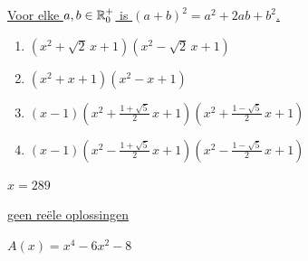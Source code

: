 \documentclass{ximera}
\begin{document}
\begin{oplossing} 
\hyperlink{oef4.10}{Voor elke $a,b \in \mathbb{R}^+_0$ is $(a+b)^2 = a^2 + 2ab + b^2$.}
\end{oplossing} 

\begin{oplossing} 
\begin{enumerate}
\item
\hyperlink{oef4.11}{$(x^2+\sqrt{2}\,x+1)(x^2-\sqrt{2}\,x+1)$}
\item
\hyperlink{oef4.11}{$(x^2+x+1)(x^2-x+1)$}
\item
\hyperlink{oef4.11}{$(x-1)\left(x^2+\frac{1+\sqrt{5}}{2}\,x+1\right)\left(x^2+\frac{1-\sqrt{5}}{2}\,x+1\right)$}
\item
\hyperlink{oef4.11}{$(x-1)\left(x^2-\frac{1+\sqrt{5}}{2}\,x+1\right)\left(x^2-\frac{1-\sqrt{5}}{2}\,x+1\right)$}
\end{enumerate}
\setcounter{enumi}{16}
\end{oplossing} 

\begin{oplossing} 
\hyperlink{oef4.17}{$x=289$}
\end{oplossing} 

\begin{oplossing} 
\hyperlink{oef4.18}{geen re\"ele oplossingen}
\end{oplossing} 

\begin{oplossing} 
\hyperlink{oef4.19}{$A(x)=x^4-6x^2-8$}
\end{oplossing} 

\end{document}
